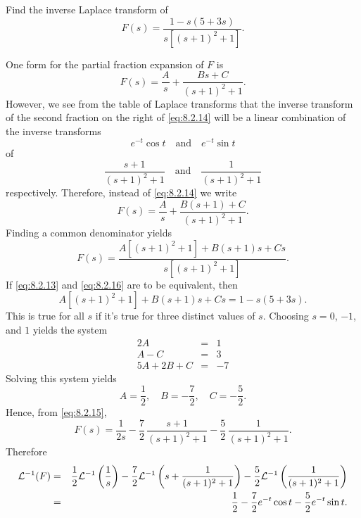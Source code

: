 \documentclass{ximera}
\begin{document}
\begin{example}\label{example:8.2.8} %
 Find the inverse Laplace transform of
\begin{equation}\label{eq:8.2.13}
F(s)=\frac{1-s(5+3s)}{s\left[(s+1)^2+1\right]}.
\end{equation}
\begin{explanation}
One  form for the partial fraction expansion of $F$ is
\begin{equation}\label{eq:8.2.14}
F(s)=\frac{A}{s}+\frac{Bs+C}{(s+1)^2+1}.
\end{equation}
However, we see from the table of Laplace transforms that the inverse
transform of the second fraction on the right of \eqref{eq:8.2.14} will be
a linear combination of the inverse transforms
$$
e^{-t}\cos t\quad\mbox{and}\quad e^{-t}\sin t
$$
of
$$
\frac{s+1}{(s+1)^2+1}\quad\mbox{and}\quad \frac{1}{(s+1)^2+1}
$$
respectively. Therefore, instead of \eqref{eq:8.2.14} we write
\begin{equation}\label{eq:8.2.15}
F(s)=\frac{A}{s}+\frac{B(s+1)+C}{(s+1)^2+1}.
\end{equation}
Finding a common denominator yields
\begin{equation}\label{eq:8.2.16}
F(s)=\frac{A\left[(s+1)^2+1\right]+B(s+1)s+Cs}{s\left[(s+1)^2+1\right]}.
\end{equation}
If  \eqref{eq:8.2.13} and  \eqref{eq:8.2.16} are to be equivalent, then
$$
A\left[(s+1)^2+1\right]+B(s+1)s+Cs=1-s(5+3s).
$$
This is true for all $s$ if it's true for three distinct values of
$s$.  Choosing $s=0$, $-1$, and $1$ yields the system
$$
\begin{array}{rcr}
2A&=&1\\ A-C&=&3\\5A+2B+C&=&-7
\end{array}
$$
Solving this system yields
$$
A=\frac{1}{2},\quad B=-\frac{7}{2},\quad C=-\frac{5}{2}.
$$
Hence, from  \eqref{eq:8.2.15},
$$
F(s)=\frac{1}{2s}-\frac{7}{2}\,\frac{s+1}{(s+1)^2+1}-
\frac{5}{2}\,\frac{1}{(s+1)^2+1}.
$$
Therefore
\begin{eqnarray*}
{\cal L}^{-1}(F)&=&
\frac{1}{2}{\cal L}^{-1}\left(\frac{1}{s}\right)-{\frac{7}{2}}{\cal
L}^{-1}\left(s+\frac{1
}{(s+1)^2+1}\right)-\frac{5}{2} {\cal L}^{-1}\left(\frac{1}{(s+1)^2+1}\right)\\
&=& {\frac{1}{2}}-{\frac{7}{2}}e^{-t}\cos t-{\frac{5}{2}}e^{-t}\sin t.
\end{eqnarray*}
\end{explanation}
\end{example}
\end{document}
